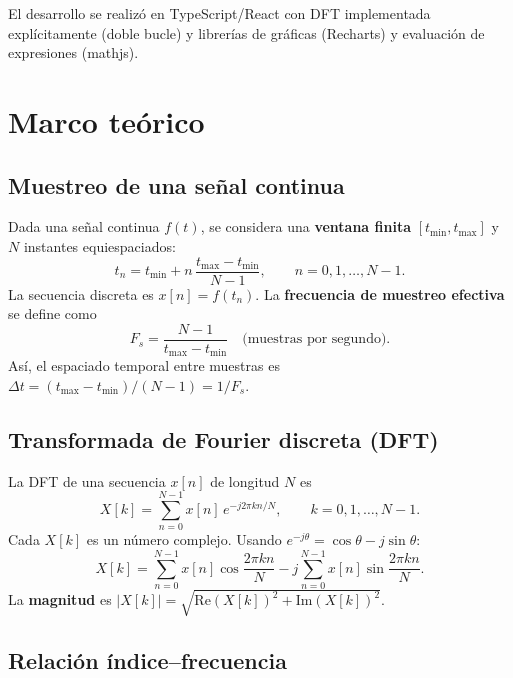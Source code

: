 \documentclass[12pt,a4paper]{article}
\begin{document}
El desarrollo se realizó en TypeScript/React con DFT implementada explícitamente (doble bucle) y librerías de gráficas (Recharts) y evaluación de expresiones (mathjs).

\section{Marco teórico}

\subsection{Muestreo de una señal continua}

Dada una señal continua \(f(t)\), se considera una \textbf{ventana finita} \([t_{\min}, t_{\max}]\) y \(N\) instantes equiespaciados:
\begin{equation}
  t_n = t_{\min} + n\,\frac{t_{\max} - t_{\min}}{N-1}, \qquad n = 0, 1, \ldots, N-1.
\end{equation}
La secuencia discreta es \(x[n] = f(t_n)\). La \textbf{frecuencia de muestreo efectiva} se define como
\begin{equation}
  F_s = \frac{N-1}{t_{\max} - t_{\min}} \quad \text{(muestras por segundo)}.
\end{equation}
Así, el espaciado temporal entre muestras es \(\Delta t = (t_{\max}-t_{\min})/(N-1) = 1/F_s\).

\subsection{Transformada de Fourier discreta (DFT)}

La DFT de una secuencia \(x[n]\) de longitud \(N\) es
\begin{equation}
  X[k] = \sum_{n=0}^{N-1} x[n]\, e^{-j2\pi kn/N}, \qquad k = 0, 1, \ldots, N-1.
  \label{eq:dft}
\end{equation}
Cada \(X[k]\) es un número complejo. Usando \(e^{-j\theta} = \cos\theta - j\sin\theta\):
\begin{equation}
  X[k] = \sum_{n=0}^{N-1} x[n]\cos\frac{2\pi kn}{N} - j\sum_{n=0}^{N-1} x[n]\sin\frac{2\pi kn}{N}.
\end{equation}
La \textbf{magnitud} es \(|X[k]| = \sqrt{\mathrm{Re}(X[k])^2 + \mathrm{Im}(X[k])^2}\).

\subsection{Relación índice--frecuencia}
\end{document}
